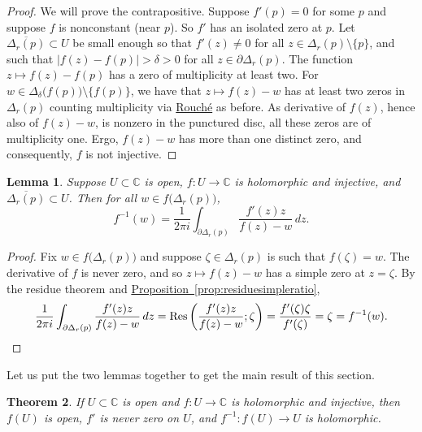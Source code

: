 \documentclass[12pt,openany]{book}
\newcommand{\sabs}[1]{\lvert {#1} \rvert}
\newcommand{\C}{{\mathbb{C}}}
\theoremstyle{plain}
\newtheorem{thm}{Theorem}[section]
\newtheorem{lemma}[thm]{Lemma}
\theoremstyle{remark}
\theoremstyle{definition}
\theoremstyle{exercise}
\theoremstyle{example}
\newcommand{\propref}[1]{\hyperref[#1]{Proposition~\ref*{#1}}}
\begin{document}
\begin{proof}
We will prove the contrapositive.
Suppose $f'(p) = 0$ for some $p$
and suppose $f$ is nonconstant (near $p$).
So $f'$ has
an isolated zero at $p$.
Let $\overline{\Delta_r(p)} \subset U$
be small enough so that $f'(z) \not= 0$ for all $z \in \Delta_r(p) \setminus \{ p \}$,
and such that $\sabs{f(z)-f(p)} > \delta > 0$ for all $z \in \partial
\Delta_r(p)$.
The function $z \mapsto f(z) - f(p)$ has a zero of multiplicity at least
two.
For $w \in \Delta_{\delta}\bigl(f(p)\bigr) \setminus \bigl\{ f(p) \bigr\}$,
we have that
$z \mapsto f(z)-w$ has at least two zeros in $\Delta_r(p)$ counting multiplicity via
\hyperref[thm:rouche2]{Rouch\'e} as
before.  As derivative of $f(z)$, hence also of $f(z)-w$, is nonzero in
the punctured disc, all these zeros are of multiplicity one.  Ergo, $f(z)-w$
has more than one distinct zero, and consequently, $f$ is not injective.
\end{proof}

\begin{lemma} \label{lemma:inverseasintegral}
Suppose $U \subset \C$ is open,
$f \colon U \to \C$ is holomorphic and injective, and
$\overline{\Delta_r(p)} \subset U$.  Then for all $w \in
f\bigl(\Delta_r(p)\bigr)$,
\begin{equation*}
f^{-1}(w) = \frac{1}{2\pi i} \int_{\partial \Delta_r(p)}
\frac{f'(z)z}{f(z)-w} \, dz .
\end{equation*}
\end{lemma}

\begin{proof}
Fix $w \in f\bigl(\Delta_r(p)\bigr)$ and suppose $\zeta \in \Delta_r(p)$
is such that $f(\zeta) = w$.
The derivative of $f$ is never zero, and so $z \mapsto f(z)-w$ has a simple
zero at $z=\zeta$.  By the residue theorem and
\propref{prop:residuesimpleratio},
\begin{equation*}
\frac{1}{2\pi i} \int_{\partial \Delta_r(p)}
\frac{f'(z)z}{f(z)-w} \, dz
=
\operatorname{Res}\left(\frac{f'(z)z}{f(z)-w};\zeta\right)
=
\frac{f'(\zeta)\zeta}{f'(\zeta)} = \zeta = f^{-1}(w) .
\qedhere
\end{equation*}
\end{proof}

Let us put the two lemmas together to get the main result of this section.

\begin{thm}
If $U \subset \C$ is open and $f \colon U \to \C$ is holomorphic and
injective, then $f(U)$ is open, $f'$ is never zero on $U$, and $f^{-1}
\colon f(U) \to U$ is holomorphic.
\end{thm}
\end{document}

